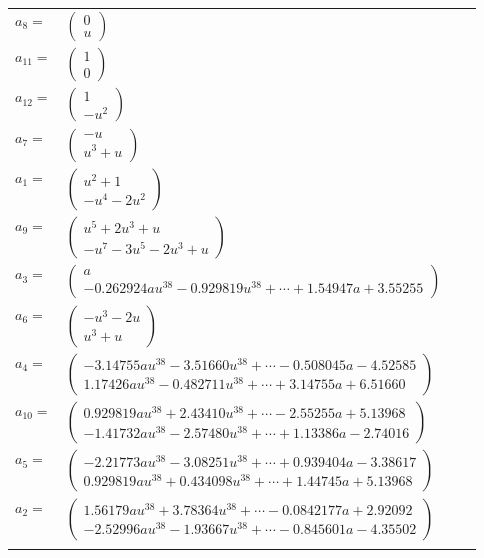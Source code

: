 \documentclass[1p]{elsarticle_modified}
\theoremstyle{definition}
\begin{document}
\begin{tabular}{m{7pt} m{180pt} m{7pt} m{180pt} }
\flushright $a_{8}=$&$\begin{pmatrix}0\\u\end{pmatrix}$ \\
\flushright $a_{11}=$&$\begin{pmatrix}1\\0\end{pmatrix}$ \\
\flushright $a_{12}=$&$\begin{pmatrix}1\\- u^2\end{pmatrix}$ \\
\flushright $a_{7}=$&$\begin{pmatrix}- u\\u^3+u\end{pmatrix}$ \\
\flushright $a_{1}=$&$\begin{pmatrix}u^2+1\\- u^4-2 u^2\end{pmatrix}$ \\
\flushright $a_{9}=$&$\begin{pmatrix}u^5+2 u^3+u\\- u^7-3 u^5-2 u^3+u\end{pmatrix}$ \\
\flushright $a_{3}=$&$\begin{pmatrix}a\\-0.262924 a u^{38}-0.929819 u^{38}+\cdots+1.54947 a+3.55255\end{pmatrix}$ \\
\flushright $a_{6}=$&$\begin{pmatrix}- u^3-2 u\\u^3+u\end{pmatrix}$ \\
\flushright $a_{4}=$&$\begin{pmatrix}-3.14755 a u^{38}-3.51660 u^{38}+\cdots-0.508045 a-4.52585\\1.17426 a u^{38}-0.482711 u^{38}+\cdots+3.14755 a+6.51660\end{pmatrix}$ \\
\flushright $a_{10}=$&$\begin{pmatrix}0.929819 a u^{38}+2.43410 u^{38}+\cdots-2.55255 a+5.13968\\-1.41732 a u^{38}-2.57480 u^{38}+\cdots+1.13386 a-2.74016\end{pmatrix}$ \\
\flushright $a_{5}=$&$\begin{pmatrix}-2.21773 a u^{38}-3.08251 u^{38}+\cdots+0.939404 a-3.38617\\0.929819 a u^{38}+0.434098 u^{38}+\cdots+1.44745 a+5.13968\end{pmatrix}$ \\
\flushright $a_{2}=$&$\begin{pmatrix}1.56179 a u^{38}+3.78364 u^{38}+\cdots-0.0842177 a+2.92092\\-2.52996 a u^{38}-1.93667 u^{38}+\cdots-0.845601 a-4.35502\end{pmatrix}$\\&\end{tabular}
\end{document}
